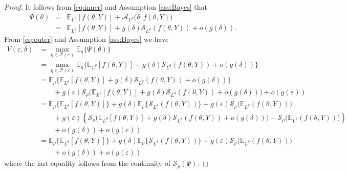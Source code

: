 \documentclass[11pt,reqno,letter]{amsart}
\theoremstyle{plain}
\theoremstyle{definition}
\numberwithin{equation}{section}
\numberwithin{theorem}{section}
\numberwithin{table}{section}
\numberwithin{figure}{section}
\begin{document}
\begin{proof}
It follows from \eqref{eq:inner} and Assumption \ref{ass:Bayes} that
\begin{eqnarray*}
\Psi(\theta)  &= &   {\mathbb E}_{L^\theta}[f(\theta, Y)]  + {\mathcal A}_{L^\theta}\big(\delta; f(\theta, Y)\big) \\ & = & {\mathbb E}_{L^\theta}[f(\theta, Y)]  + g(\delta) {\mathcal S}_{L^\theta}(f(\theta, Y))+ o(g(\delta)).
\end{eqnarray*}
From \eqref{eq:outer} and Assumption \ref{ass:Bayes} we have
\begin{align*}
V(\varepsilon, \delta) & =  \max_{\eta \in {\mathcal P}(\varepsilon)} {\mathbb E}_\eta \big\{\Psi(\theta) \big\} \\[8pt] 
& = \max_{\eta \in {\mathcal P}(\varepsilon)} {\mathbb E}_\eta\Big\{{\mathbb E}_{L^\theta}[f(\theta, Y)]  + g(\delta) {\mathcal S}_{L^\theta}(f(\theta, Y))+ o(g(\delta))\Big\} \\[8pt]
& = {\mathbb E}_\rho\Big\{{\mathbb E}_{L^\theta}[f(\theta, Y)]+ g(\delta) {\mathcal S}_{L^\theta}(f(\theta, Y))+ o(g(\delta)) \Big\} \\[8pt]
& \qquad + g(\varepsilon){\mathcal S}_\rho\Big({\mathbb E}_{L^\theta}[f(\theta, Y)]  + g(\delta) {\mathcal S}_{L^\theta}(f(\theta, Y))+ o(g(\delta))\Big) + o(g(\varepsilon)) \\[8pt]
& = {\mathbb E}_\rho\Big\{{\mathbb E}_{L^\theta}[f(\theta, Y)] \Big\} + g(\delta){\mathbb E}_\rho\Big\{{\mathcal S}_{L^\theta}(f(\theta, Y))\Big\}  +  g(\varepsilon) {\mathcal S}_\rho\Big({\mathbb E}_{L^\theta}(f(\theta, Y))\Big) \\[8pt]
& \qquad + g(\varepsilon) \left\{{\mathcal S}_\rho\Big({\mathbb E}_{L^\theta}[f(\theta, Y)]  + g(\delta) {\mathcal S}_{L^\theta}(f(\theta, Y)) + o(g(\delta)) \Big) - {\mathcal S}_\rho\Big({\mathbb E}_{L^\theta}(f(\theta, Y))\Big)\right\}  
\\[8pt]
& 
\qquad + o(g(\delta)) + o(g({\varepsilon})) \\[8pt]
& = {\mathbb E}_\rho\Big\{{\mathbb E}_{L^\theta}[f(\theta, Y)] \Big\} + g(\delta){\mathbb E}_\rho\Big\{{\mathcal S}_{L^\theta}(f(\theta, Y))\Big\}  +  g(\varepsilon) {\mathcal S}_\rho\Big({\mathbb E}_{L^\theta}(f(\theta, Y))\Big) \\[8pt] 
& \qquad + o(g(\delta)) + o(g({\varepsilon}))
\end{align*}
where the last equality follows from the continuity of ${\mathcal S}_\rho(\Psi)$.
\end{proof}
\end{document}
